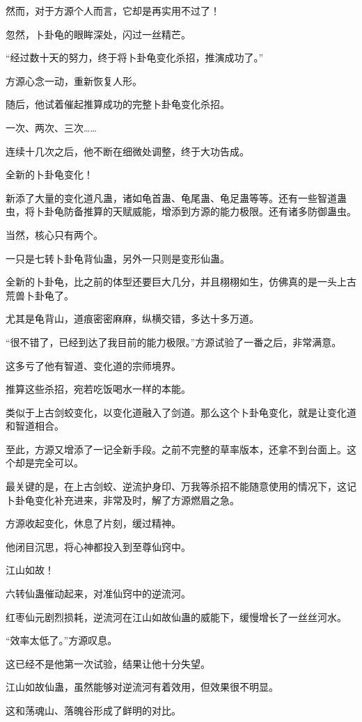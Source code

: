 \begin{this_body}
然而，对于方源个人而言，它却是再实用不过了！

忽然，卜卦龟的眼眸深处，闪过一丝精芒。

“经过数十天的努力，终于将卜卦龟变化杀招，推演成功了。”

方源心念一动，重新恢复人形。

随后，他试着催起推算成功的完整卜卦龟变化杀招。

一次、两次、三次……

连续十几次之后，他不断在细微处调整，终于大功告成。

全新的卜卦龟变化！

新添了大量的变化道凡蛊，诸如龟首蛊、龟尾蛊、龟足蛊等等。还有一些智道蛊虫，将卜卦龟防备推算的天赋威能，增添到方源的能力极限。还有诸多防御蛊虫。

当然，核心只有两个。

一只是七转卜卦龟背仙蛊，另外一只则是变形仙蛊。

全新的卜卦龟，比之前的体型还要巨大几分，并且栩栩如生，仿佛真的是一头上古荒兽卜卦龟了。

尤其是龟背山，道痕密密麻麻，纵横交错，多达十多万道。

“很不错了，已经到达了我目前的能力极限。”方源试验了一番之后，非常满意。

这多亏了他有智道、变化道的宗师境界。

推算这些杀招，宛若吃饭喝水一样的本能。

类似于上古剑蛟变化，以变化道融入了剑道。那么这个卜卦龟变化，就是让变化道和智道相合。

至此，方源又增添了一记全新手段。之前不完整的草率版本，还拿不到台面上。这个却是完全可以。

最关键的是，在上古剑蛟、逆流护身印、万我等杀招不能随意使用的情况下，这记卜卦龟变化补充进来，非常及时，解了方源燃眉之急。

方源收起变化，休息了片刻，缓过精神。

他闭目沉思，将心神都投入到至尊仙窍中。

江山如故！

六转仙蛊催动起来，对准仙窍中的逆流河。

红枣仙元剧烈损耗，逆流河在江山如故仙蛊的威能下，缓慢增长了一丝丝河水。

“效率太低了。”方源叹息。

这已经不是他第一次试验，结果让他十分失望。

江山如故仙蛊，虽然能够对逆流河有着效用，但效果很不明显。

这和荡魂山、落魄谷形成了鲜明的对比。


\end{this_body}
